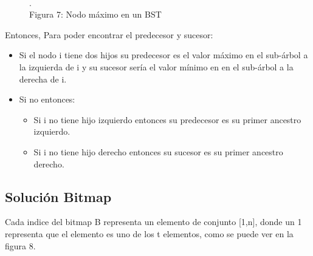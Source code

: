 \documentclass[11pt]{article}
\begin{document}
\begin{figure}[htp]
\begin{minipage}{.4\textwidth}
\\\scriptsize{\color{white}.\color{black}\\Figura 7: Nodo máximo en un BST}
\label{etiqueta}
\end{minipage}
\end{figure}

Entonces, Para poder encontrar el predecesor y sucesor:
\begin{itemize}
\item Si el nodo i tiene dos hijos su predecesor es el valor máximo en el sub-árbol a la izquierda de i y su sucesor sería el valor mínimo en en el sub-árbol a la derecha de i.
\item Si no entonces:
\begin{itemize}
\item Si i no tiene hijo izquierdo entonces su predecesor es su primer ancestro izquierdo.
\item Si i no tiene hijo derecho entonces su sucesor es su primer ancestro derecho.
\end{itemize}
\end{itemize}
\subsection{Solución Bitmap}
Cada indice del bitmap B representa un elemento de conjunto [1,n], donde un 1 representa que el elemento es uno de los t elementos, como se puede ver en la figura 8.\\
\end{document}
